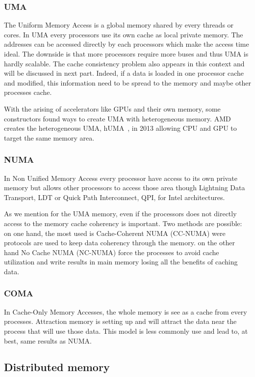\subsubsection{UMA}
The Uniform Memory Access is a global memory shared by every threads or cores. 
In UMA every processors use its own cache as local private memory. 
The addresses can be accessed directly by each processors which make the access time ideal. 
The downside is that more processors require more buses and thus UMA is hardly scalable. 
The cache consistency problem also appears in this context and will be discussed in next part. 
Indeed, if a data is loaded in one processor cache and modified, this information need to be spread to the memory and maybe other processes cache. 

With the arising of accelerators like GPUs and their own memory, some constructors found ways to create UMA with heterogeneous memory. 
AMD creates the heterogeneous UMA, hUMA~\cite{rogers2013amd}, in 2013 allowing CPU and GPU to target the same memory area.

\subsubsection{NUMA}

In Non Unified Memory Access every processor have access to its own private memory but allows other processors to access those area though Lightning Data Transport, LDT or Quick Path Interconnect, QPI, for Intel architectures. 

As we mention for the UMA memory, even if the processors does not directly access to the memory cache coherency is important. 
Two methods are possible: on one hand, the most used is Cache-Coherent NUMA (CC-NUMA) were protocols are used to keep data coherency through the memory. on the other hand No Cache NUMA (NC-NUMA) force the processes to avoid cache utilization and write results in main memory losing all the benefits of caching data. 

\subsubsection{COMA}
In Cache-Only Memory Accesses, the whole memory is see as a cache from every processes.
Attraction memory is setting up and will attract the data near the process that will use those data. 
This model is less commonly use and lead to, at best, same results as NUMA.

\subsection{Distributed memory}

